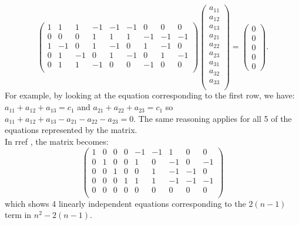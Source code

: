 \documentclass[12pt]{article}
\begin{document}
\[
\begin{pmatrix}
1 & 1 &  1 &  -1 & -1  & -1 & 0 & 0 & 0\\
0  &  0  &  0 & 1 & 1 &  1 &  -1 & -1  & -1  \\
1  &  -1  &  0 & 1 & -1  &  0 &  1 &  -1  &  0 \\
0  &  1  &  -1 & 0 &  1  &  -1 &  0 &  1  &  -1 \\
0  &  1  &  1 & -1 &  0  &  0 &  -1 &  0  &  0 \\
\end{pmatrix}
\begin{pmatrix}
a_{1 1} \\
a_{1 2} \\
a_{1 3} \\
a_{2 1} \\
a_{2 2 }  \\
a_{2 3 }  \\
a_{3 1 }  \\
a_{3 2 }  \\
a_{3 3 }  \\
\end{pmatrix}
=
\begin{pmatrix}
0\\
0\\
0\\
0\\
0
\end{pmatrix} .
\]
For example, by looking at the equation corresponding to the first row, we have: $a_{11} + a_{12} + a_{13} = c_1$ and $a_{21} + a_{22} + a_{23} = c_1$ so $a_{11} + a_{12} + a_{13} -a_{21} - a_{22} - a_{23} = 0$. The same reasoning applies for all 5 of the equations represented by the matrix. \\In rref , the matrix becomes:
\[ 
\begin{pmatrix}
1 & 0 &  0 &  0 & -1  & -1 & 1 & 0 & 0\\
0  &  1  &  0 & 0 & 1 &  0 &  -1 & 0  & -1  \\
0  &  0  &  1 & 0 & 0  &  1 &  -1 &  -1  &  0 \\
0  &  0  &  0 & 1 &  1  &  1 &  -1 &  -1  &  -1 \\
0  &  0  &  0 & 0 &  0  &  0 &  0 &  0  &  0 \\
\end{pmatrix}\] which shows 4 linearly independent equations corresponding to the $2(n-1)$ term in $n^2 - 2(n -1)$.
\end{document}
